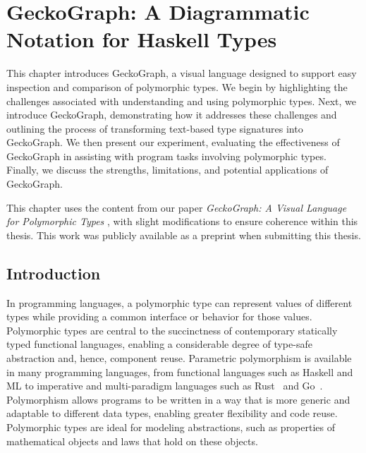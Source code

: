 


\chapter{GeckoGraph: A Diagrammatic Notation for Haskell Types}

\label{chap:gecko-graph} 
\graphicspath{{Figures/GeckoGraph}}

This chapter introduces GeckoGraph, a visual language designed to support easy inspection and comparison of polymorphic types. We begin by highlighting the challenges associated with understanding and using polymorphic types. Next, we introduce GeckoGraph, demonstrating how it addresses these challenges and outlining the process of transforming text-based type signatures into GeckoGraph. We then present our experiment, evaluating the effectiveness of GeckoGraph in assisting with program tasks involving polymorphic types. Finally, we discuss the strengths, limitations, and potential applications of GeckoGraph.  

 This chapter uses the content from our paper \textit{GeckoGraph: A Visual Language for Polymorphic Types} \cite{Fu2024-jq}, with slight modifications to ensure coherence within this thesis. This work was publicly available as a preprint when submitting this thesis.

\section{Introduction} \label{sec:intro}
In programming languages, a polymorphic type \cite{Cardelli1987-fp} can represent values of different types while providing a common interface or behavior for those values. Polymorphic types are central to the succinctness of contemporary statically typed functional languages, enabling a considerable degree of type-safe abstraction and, hence, component reuse. Parametric polymorphism is available in many programming languages, from functional languages such as Haskell and ML to imperative and multi-paradigm languages such as Rust~\cite{Klabnik_undated-wx} and Go~\cite{Griesemer_undated-ff}. Polymorphism allows programs to be written in a way that is more generic and adaptable to different data types, enabling greater flexibility and code reuse. Polymorphic types are ideal for modeling abstractions, such as properties of mathematical objects and laws that hold on these objects. 


